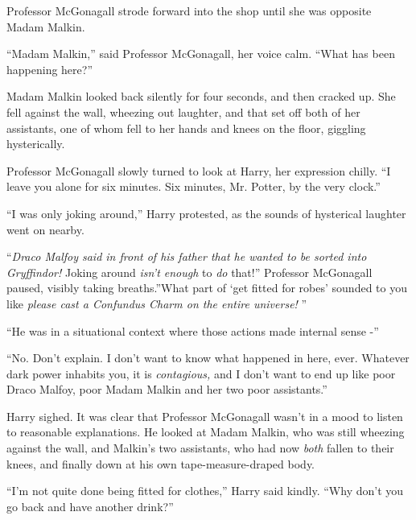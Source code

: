 Professor McGonagall strode forward into the shop until she was opposite
Madam Malkin.

``Madam Malkin,'' said Professor McGonagall, her voice calm. ``What has
been happening here?''

Madam Malkin looked back silently for four seconds, and then cracked up.
She fell against the wall, wheezing out laughter, and that set off both
of her assistants, one of whom fell to her hands and knees on the floor,
giggling hysterically.

Professor McGonagall slowly turned to look at Harry, her expression
chilly. ``I leave you alone for six minutes. Six minutes, Mr. Potter, by
the very clock.''

``I was only joking around,'' Harry protested, as the sounds of
hysterical laughter went on nearby.

``\emph{Draco Malfoy said in front of his father that he wanted to be
sorted into Gryffindor!} Joking around \emph{isn't enough} to \emph{do}
that!'' Professor McGonagall paused, visibly taking breaths.''What part
of `get fitted for robes' sounded to you like \emph{please cast a
Confundus Charm on the entire universe!} ''

``He was in a situational context where those actions made internal
sense -''

``No. Don't explain. I don't want to know what happened in here, ever.
Whatever dark power inhabits you, it is \emph{contagious,} and I don't
want to end up like poor Draco Malfoy, poor Madam Malkin and her two
poor assistants.''

Harry sighed. It was clear that Professor McGonagall wasn't in a mood to
listen to reasonable explanations. He looked at Madam Malkin, who was
still wheezing against the wall, and Malkin's two assistants, who had
now \emph{both} fallen to their knees, and finally down at his own
tape-measure-draped body.

``I'm not quite done being fitted for clothes,'' Harry said kindly.
``Why don't you go back and have another drink?''
